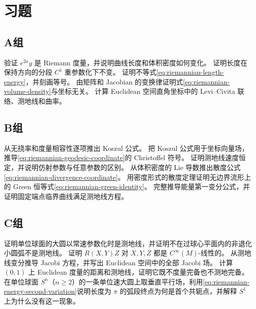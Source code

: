 \section*{习题}
\subsection*{A组}
\begin{enumerate}[label=\textbf{\thechapter.\arabic*.}]
验证 $e^{2u}g$ 是 Riemann 度量，并说明曲线长度和体积密度如何变化。
证明长度在保持方向的分段 $C^1$ 重参数化下不变。
证明不等式\eqref{eq:riemannian-length-energy}，并刻画等号。
由矩阵和 Jacobian 的变换律证明式\eqref{eq:riemannian-volume-density}与坐标无关。
计算 Euclidean 空间直角坐标中的 Levi--Civita 联络、测地线和曲率。
\end{enumerate}
\subsection*{B组}
\begin{enumerate}[label=\textbf{\thechapter.\arabic*.},resume]
从无挠率和度量相容性逐项推出 Koszul 公式。
把 Koszul 公式用于坐标向量场，推导\eqref{eq:riemannian-geodesic-coordinate}的 Christoffel 符号。
证明测地线速度恒定，并说明仿射参数与任意参数的区别。
从体积密度的 Lie 导数推出散度公式\eqref{eq:riemannian-divergence-coordinate}。
用密度形式的散度定理证明无边界流形上的 Green 恒等式\eqref{eq:riemannian-green-identity}。
完整推导能量第一变分公式，并证明固定端点临界曲线满足测地线方程。
\end{enumerate}
\subsection*{C组}
\begin{enumerate}[label=\textbf{\thechapter.\arabic*.},resume]
证明单位球面的大圆以常速参数化时是测地线，并证明不在过球心平面内的非退化小圆弧不是测地线。
证明 $R(X,Y)Z$ 对 $X,Y,Z$ 都是 $C^\infty(M)$-线性的。
从测地线变分推导 Jacobi 方程，并写出 Euclidean 空间中的全部 Jacobi 场。
计算 $(0,1)$ 上 Euclidean 度量的距离和测地线，证明它既不度量完备也不测地完备。
在单位球面 $S^n$（$n\geq2$）的一条单位速大圆上取垂直平行场，利用\eqref{eq:riemannian-energy-second-variation}说明长度为 $\pi$ 的弧段终点为何是首个共轭点，并解释 $S^1$ 上为什么没有这一现象。
\end{enumerate}
